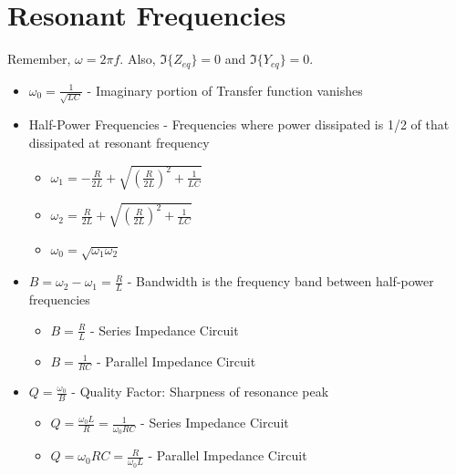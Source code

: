 \section*{Resonant Frequencies} \label{sec:Frequency Resonance}
Remember, $\omega = 2 \pi f$.
Also, $\Im \lbrace Z_{eq} \rbrace = 0$ and $\Im \lbrace Y_{eq} \rbrace = 0$.
\begin{itemize}[nolistsep]
	\item $\omega_{0} = \frac{1}{\sqrt{LC}}$ - Imaginary portion of Transfer function vanishes
	\item Half-Power Frequencies - Frequencies where power dissipated is 1/2 of that dissipated at resonant frequency
	\begin{itemize}[noitemsep]
		\item $\omega_{1} = - \frac{R}{2L} + \sqrt{\left( \frac{R}{2L} \right)^{2} + \frac{1}{LC}}$
		\item $\omega_{2} = \frac{R}{2L} + \sqrt{\left( \frac{R}{2L} \right)^{2} + \frac{1}{LC}}$
		\item $\omega_{0} = \sqrt{\omega_{1}\omega_{2}}$
	\end{itemize}
	\item $B = \omega_{2} - \omega_{1} = \frac{R}{L}$ - Bandwidth is the frequency band between half-power frequencies
	\begin{itemize}[noitemsep]
		\item $B = \frac{R}{L}$ - Series Impedance Circuit
		\item $B = \frac{1}{RC}$ - Parallel Impedance Circuit
	\end{itemize}
	\item $Q = \frac{\omega_{0}}{B}$ - Quality Factor: Sharpness of resonance peak
	\begin{itemize}[noitemsep]
		\item $Q =\frac{\omega_{0}L}{R} = \frac{1}{\omega_{0}RC}$ - Series Impedance Circuit
		\item $Q = \omega_{0}RC = \frac{R}{\omega_{0}L}$ - Parallel Impedance Circuit
	\end{itemize}
\end{itemize}
